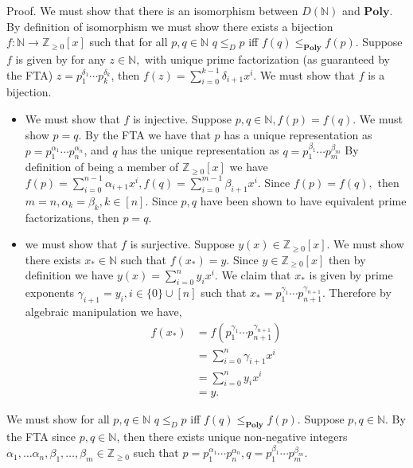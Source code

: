 \documentclass[12pt, letterpaper]{article}
\newcommand{\Z}{\mathbb{Z}}
\newcommand{\N}{\mathbb{N}}
\newcommand{\poly}{\textbf{Poly}}
\begin{document}
Proof.  We must show that there is an isomorphism between $D(\mathbb{N})$ and $\textbf{Poly}$.  By definition of isomorphism we must show there exists a bijection $f: \N \to \Z_{\geq 0}[x]$ such that for all $p,q \in \N$ $q \leq_D p$ iff $f(q) \leq_\poly f(p).$  Suppose $f$ is given by for any $z \in \N,$ with unique prime factorization (as guaranteed by the FTA) $z=p_1^{\delta_1}\cdots p_k^{\delta_k}$, then $f(z) = \sum^{k-1}_{i=0} \delta_{i+1} x^i.$  We must show that $f$ is a bijection.  \begin{itemize}
	\item We must show that $f$ is injective. Suppose $p,q \in \N, f(p) = f(q).$  We must show $p = q.$ By the FTA we have that $p$ has a unique representation as $p = p_1^{\alpha_1}\cdots p_n^{\alpha_n}$, and $q$ has the unique representation as $q = p_1^{\beta_1}\cdots p_m^{\beta_m}$  By definition of being a member of $\Z_{\geq 0}[x]$ we have $f(p) = \sum^{n-1}_{i=0} \alpha_{i+1} x^i, f(q) = \sum^{m-1}_{i=0} \beta_{i+1} x^i.$  Since $f(p) = f(q),$ then $m=n, \alpha_k = \beta_k, k \in [n].$  Since $p,q$ have been shown to have equivalent prime factorizations, then $p=q$. 
	\item we must show that $f$ is surjective.  Suppose $y(x) \in \Z_{\geq 0}[x].$  We must show there exists $x_* \in \N$ such that $f(x_*) = y.$  Since $y \in \Z_{\geq 0}[x]$ then by definition we have $y(x) = \sum^n_{i=0} y_i x^i$.  We claim that $x_*$ is given by prime exponents $\gamma_{i+1} = y_i, i \in \{0\}\cup [n]$ such that $x_* = p_1^{\gamma_1}\cdots p_{n+1}^{\gamma_{n+1}}.$  Therefore by algebraic manipulation we have,
	\begin{align*}
		f(x_*) &= f(p_1^{\gamma_1}\cdots p_{n+1}^{\gamma_{n+1}})\\
		&= \sum^n_{i=0} \gamma_{i+1}x^i \\
		&= \sum^n_{i=0} y_{i}x^i \\
		&= y.
	\end{align*}
\end{itemize}
	We must show for all $p,q \in \N$ $q \leq_D p$ iff $f(q) \leq_\poly f(p).$  Suppose $p,q \in \N$.  By the FTA since $p,q \in \N$, then there exists unique non-negative integers $\alpha_1,\ldots\alpha_n,\beta_1,\ldots,\beta_m \in \Z_{\geq 0}$ such that $p = p_1^{\alpha_1}\cdots p_n^{\alpha_n}, q=p_1^{\beta_1}\cdots p_m^{\beta_m}.$
\end{document}
